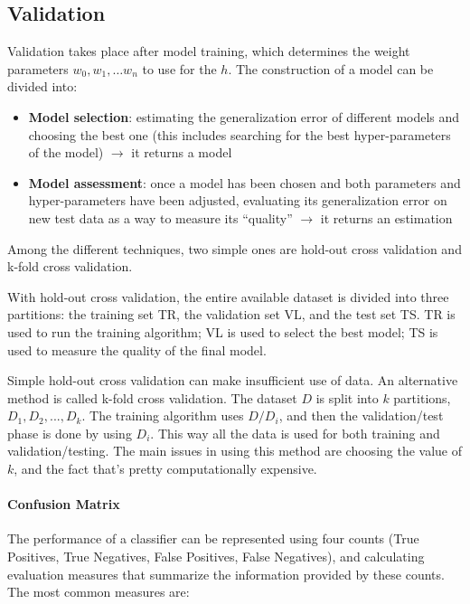 \subsection{Validation}

Validation takes place after model training, which determines the weight parameters $w_0, w_1, \dots w_n$ to use for the $h$. The construction of a model can be divided into:

\begin{itemize}
    \item \textbf{Model selection}: estimating the generalization error of different models and choosing the best one (this includes searching for the best hyper-parameters of the model) $\xrightarrow{}$ it returns a model

    \item \textbf{Model assessment}: once a model has been chosen and both parameters and hyper-parameters have been adjusted, evaluating its generalization error on new test data as a way to measure its ``quality'' $\xrightarrow{}$ it returns an estimation
\end{itemize}

Among the different techniques, two simple ones are hold-out cross validation and k-fold cross validation.

With hold-out cross validation, the entire available dataset is divided into three partitions: the training set TR, the validation set VL, and the test set TS. TR is used to run the training algorithm; VL is used to select the best model; TS is used to measure the quality of the final model.

Simple hold-out cross validation can make insufficient use of data. An alternative method is called k-fold cross validation. The dataset $D$ is split into $k$ partitions, $D_1, D_2, ..., D_k$. The training algorithm uses $D/D_i$, and then the validation/test phase is done by using $D_i$. This way all the data is used for both training and validation/testing. The main issues in using this method are choosing the value of $k$, and the fact that's pretty computationally expensive.

\paragraph{Confusion Matrix}
The performance of a classifier can be represented using four counts (True Positives, True Negatives, False Positives, False Negatives), and calculating evaluation measures that summarize the information provided by these counts. The most common measures are:

